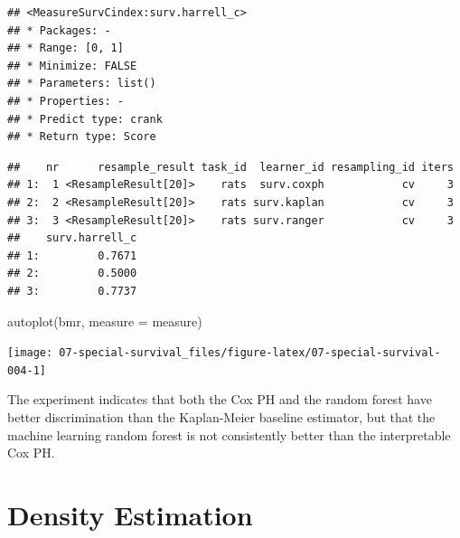 \documentclass[
]{scrbook}
\newenvironment{Shaded}{\begin{snugshade}}{\end{snugshade}}
\newcommand{\AttributeTok}[1]{\textcolor[rgb]{0.77,0.63,0.00}{#1}}
\newcommand{\DecValTok}[1]{\textcolor[rgb]{0.00,0.00,0.81}{#1}}
\newcommand{\FunctionTok}[1]{\textcolor[rgb]{0.00,0.00,0.00}{#1}}
\newcommand{\NormalTok}[1]{#1}
\newcommand{\OtherTok}[1]{\textcolor[rgb]{0.56,0.35,0.01}{#1}}
\newcommand{\SpecialCharTok}[1]{\textcolor[rgb]{0.00,0.00,0.00}{#1}}
\newcommand{\StringTok}[1]{\textcolor[rgb]{0.31,0.60,0.02}{#1}}
\renewenvironment{Shaded} {\begin{snugshade}\small} {\end{snugshade}}
\begin{document}
\begin{verbatim}
## <MeasureSurvCindex:surv.harrell_c>
## * Packages: -
## * Range: [0, 1]
## * Minimize: FALSE
## * Parameters: list()
## * Properties: -
## * Predict type: crank
## * Return type: Score
\end{verbatim}

\begin{Shaded}
\end{Shaded}

\begin{verbatim}
##    nr      resample_result task_id  learner_id resampling_id iters
## 1:  1 <ResampleResult[20]>    rats  surv.coxph            cv     3
## 2:  2 <ResampleResult[20]>    rats surv.kaplan            cv     3
## 3:  3 <ResampleResult[20]>    rats surv.ranger            cv     3
##    surv.harrell_c
## 1:         0.7671
## 2:         0.5000
## 3:         0.7737
\end{verbatim}

\begin{Shaded}
\begin{Highlighting}[]
\FunctionTok{autoplot}\NormalTok{(bmr, }\AttributeTok{measure =}\NormalTok{ measure)}
\end{Highlighting}
\end{Shaded}

\begin{center}\texttt{[image: 07-special-survival\_files/figure-latex/07-special-survival-004-1]} \end{center}

The experiment indicates that both the Cox PH and the random forest have better discrimination than the Kaplan-Meier baseline estimator, but that the machine learning random forest is not consistently better than the interpretable Cox PH.

\hypertarget{density}{%
\section{Density Estimation}\label{density}}
\end{document}
